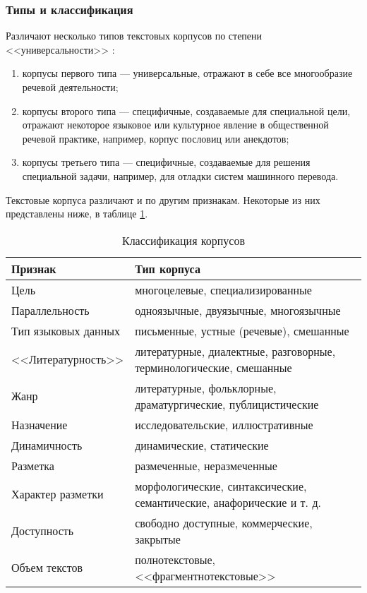\subsubsection{Типы и классификация}

Различают несколько типов текстовых корпусов по степени <<универсальности>> \cite{kl}:
\begin{enumerate}
    \item корпусы первого типа --- универсальные, отражают в себе все многообразие речевой деятельности;
    \item корпусы второго типа --- специфичные, создаваемые для специальной цели, отражают некоторое языковое или культурное явление в общественной речевой практике, например, корпус пословиц или анекдотов;
    \item корпусы третьего типа --- специфичные, создаваемые для решения специальной задачи, например, для отладки систем машинного перевода.
\end{enumerate}

Текстовые корпуса различают и по другим признакам.
Некоторые из них представлены ниже, в таблице \ref{tab:coc}.
\begin{table}[H]
\centering
        \caption{Классификация корпусов \cite[с. 16]{kl}}
		\label{tab:coc}
        \begin{adjustbox}{width=1\textwidth}
            \begin{tabular}{|p{}|p{}|}
        \hline
        Признак & Тип корпуса \\
        \hline
        \hline
        Цель & многоцелевые, специализированные \\
        \hline
        Параллельность & одноязычные, двуязычные, многоязычные \\
        \hline
        Тип языковых данных & письменные, устные (речевые), смешанные \\
        \hline
        <<Литературность>> & литературные, диалектные, разговорные, терминологические, смешанные \\
        \hline
        Жанр & литературные, фольклорные, драматургические, публицистические \\
        \hline
        Назначение & исследовательские, иллюстративные \\
        \hline
        Динамичность & динамические, статические \\
        \hline
        Разметка & размеченные, неразмеченные \\
        \hline
        Характер разметки & морфологические, синтаксические, семантические, анафорические и т. д. \\
        \hline
        Доступность & свободно доступные, коммерческие, закрытые \\
        \hline
        Объем текстов & полнотекстовые, <<фрагментнотекстовые>> \\
        \hline
		\end{tabular}
        \end{adjustbox}
\end{table}

